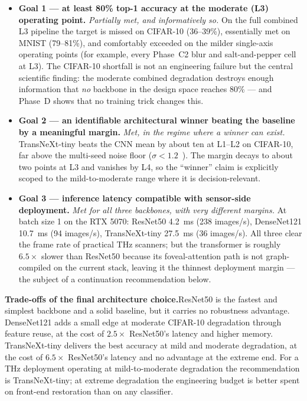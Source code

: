 \begin{itemize}
  \item \textbf{Goal 1 --- at least 80\% top-1 accuracy at the moderate (L3)
        operating point.} \emph{Partially met, and informatively so.} On the
        full combined L3 pipeline the target is missed on CIFAR-10
        (36--39\%), essentially met on MNIST (79--81\%), and comfortably
        exceeded on the milder single-axis operating points (for example,
        every Phase~C2 blur and salt-and-pepper cell at L3). The CIFAR-10
        shortfall is not an engineering failure but the central scientific
        finding: the moderate combined degradation destroys enough
        information that \emph{no} backbone in the design space reaches
        80\% --- and Phase~D shows that no training trick changes this.
  \item \textbf{Goal 2 --- an identifiable architectural winner beating the
        baseline by a meaningful margin.} \emph{Met, in the regime where a
        winner can exist.} TransNeXt-tiny beats the CNN mean by about ten
        \Mpp{} at L1--L2 on CIFAR-10, far above the multi-seed noise floor
        ($\sigma < 1.2$~\Mpp{}). The margin decays to about two points at L3
        and vanishes by L4, so the ``winner'' claim is explicitly scoped to
        the mild-to-moderate range where it is decision-relevant.
  \item \textbf{Goal 3 --- inference latency compatible with sensor-side
        deployment.} \emph{Met for all three backbones, with very different
        margins.} At batch size 1 on the RTX 5070: ResNet50 4.2~ms
        (238 images/s), DenseNet121 10.7~ms (94 images/s), TransNeXt-tiny
        27.5~ms (36 images/s). All three clear the frame rate of practical
        THz scanners; but the transformer is roughly $6.5\times$ slower than
        ResNet50 because its foveal-attention path is not graph-compiled on
        the current stack, leaving it the thinnest deployment margin ---
        the subject of a continuation recommendation below.
\end{itemize}

\textbf{Trade-offs of the final architecture choice.}\quad ResNet50 is the
fastest and simplest backbone and a solid baseline, but it carries no
robustness advantage. DenseNet121 adds a small edge at moderate CIFAR-10
degradation through feature reuse, at the cost of $2.5\times$ ResNet50's
latency and higher memory. TransNeXt-tiny delivers the best accuracy at mild
and moderate degradation, at the cost of $6.5\times$ ResNet50's latency and
no advantage at the extreme end. For a THz deployment operating at
mild-to-moderate degradation the recommendation is TransNeXt-tiny; at
extreme degradation the engineering budget is better spent on front-end
restoration than on any classifier.

